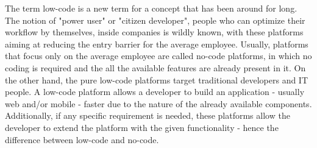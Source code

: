 \documentclass{sigchi}
\begin{document}
The term low-code is a new term for a concept that has been around for long. The notion of "power user" or "citizen developer", people who can optimize their workflow by themselves,  inside companies is wildly known, with these platforms aiming at reducing the entry barrier for the average employee\cite{12436424020170801}. Usually, platforms that focus only on the average employee are called no-code platforms, in which no coding is required and the all the available features are already present in it. On the other hand, the pure low-code platforms target traditional developers and IT people.
A low-code platform allows a developer to build an application - usually web and/or mobile - faster due to the nature of the already available components. Additionally, if any specific requirement is needed, these platforms allow the developer to extend the platform with the given functionality - hence the difference between low-code and no-code. 
\end{document}
